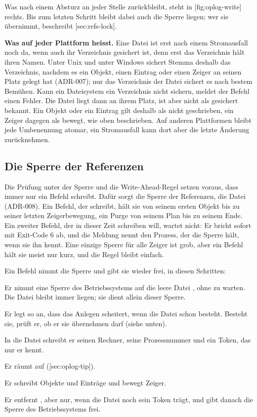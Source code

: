 {Was nach einem Absturz an jeder Stelle zurückbleibt, steht in
[fig:oplog-write] rechts.
Bis zum letzten Schritt bleibt dabei auch die Sperre liegen;
wer sie übernimmt, beschreibt [sec:refs-lock].

\startinfobox
{\bf Was  auf jeder Plattform heisst.}
Eine Datei ist erst nach einem Stromausfall noch da, wenn auch ihr Verzeichnis gesichert ist,
denn erst das Verzeichnis hält ihren Namen.
Unter Unix und unter Windows sichert Stemma deshalb das Verzeichnis,
nachdem es ein Objekt, einen Eintrag oder einen Zeiger an seinen Platz gelegt hat (ADR-007);
nur das Verzeichnis der Datei  sichert es nach bestem Bemühen.
Kann ein Dateisystem ein Verzeichnis nicht sichern, meldet der Befehl einen Fehler.
Die Datei liegt dann an ihrem Platz, ist aber nicht als gesichert bekannt.
Ein Objekt oder ein Eintrag gilt deshalb als nicht geschrieben,
ein Zeiger dagegen als bewegt, wie oben beschrieben.
Auf anderen Plattformen bleibt jede Umbenennung atomar,
ein Stromausfall kann dort aber die letzte Änderung zurücknehmen.
\stopinfobox

\subsection[sec:refs-lock]{Die Sperre der Referenzen}

Die Prüfung unter der Sperre und die Write-Ahead-Regel setzen voraus,
dass immer nur ein Befehl schreibt.
Dafür sorgt die Sperre der Referenzen, die Datei  (ADR-008).
Ein Befehl, der schreibt, hält sie von seinem ersten Objekt bis zu seiner letzten Zeigerbewegung,
ein Purge von seinem Plan bis zu seinem Ende.
Ein zweiter Befehl, der in dieser Zeit schreiben will, wartet nicht:
Er bricht sofort mit Exit-Code 6 ab,
und die Meldung nennt den Prozess, der die Sperre hält, wenn sie ihn kennt.
Eine einzige Sperre für alle Zeiger ist grob,
aber ein Befehl hält sie meist nur kurz, und die Regel bleibt einfach.

Ein Befehl nimmt die Sperre und gibt sie wieder frei, in diesen Schritten:

\startitemize[n]
\item Er nimmt eine Sperre des Betriebssystems auf die leere Datei ,
ohne zu warten. Die Datei bleibt immer liegen; sie dient allein dieser Sperre.
\item Er legt  so an, dass das Anlegen scheitert, wenn die Datei schon besteht.
Besteht sie, prüft er, ob er sie übernehmen darf (siehe unten).
\item In die Datei schreibt er seinen Rechner, seine Prozessnummer
und ein Token, das nur er kennt.
\item Er räumt  auf ([sec:oplog-tip]).
\item Er schreibt Objekte und Einträge und bewegt Zeiger.
\item Er entfernt , aber nur, wenn die Datei noch sein Token trägt,
und gibt danach die Sperre des Betriebssystems frei.
\stopitemize

}
